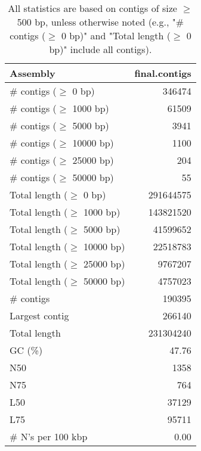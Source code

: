 \documentclass[12pt,a4paper]{article}
\begin{document}
\begin{table}[ht]
\begin{center}
\caption{All statistics are based on contigs of size $\geq$ 500 bp, unless otherwise noted (e.g., "\# contigs ($\geq$ 0 bp)" and "Total length ($\geq$ 0 bp)" include all contigs).}
\begin{tabular}{|l*{1}{|r}|}
\hline
Assembly & final.contigs \\ \hline
\# contigs ($\geq$ 0 bp) & 346474 \\ \hline
\# contigs ($\geq$ 1000 bp) & 61509 \\ \hline
\# contigs ($\geq$ 5000 bp) & 3941 \\ \hline
\# contigs ($\geq$ 10000 bp) & 1100 \\ \hline
\# contigs ($\geq$ 25000 bp) & 204 \\ \hline
\# contigs ($\geq$ 50000 bp) & 55 \\ \hline
Total length ($\geq$ 0 bp) & 291644575 \\ \hline
Total length ($\geq$ 1000 bp) & 143821520 \\ \hline
Total length ($\geq$ 5000 bp) & 41599652 \\ \hline
Total length ($\geq$ 10000 bp) & 22518783 \\ \hline
Total length ($\geq$ 25000 bp) & 9767207 \\ \hline
Total length ($\geq$ 50000 bp) & 4757023 \\ \hline
\# contigs & 190395 \\ \hline
Largest contig & 266140 \\ \hline
Total length & 231304240 \\ \hline
GC (\%) & 47.76 \\ \hline
N50 & 1358 \\ \hline
N75 & 764 \\ \hline
L50 & 37129 \\ \hline
L75 & 95711 \\ \hline
\# N's per 100 kbp & 0.00 \\ \hline
\end{tabular}
\end{center}
\end{table}
\end{document}
